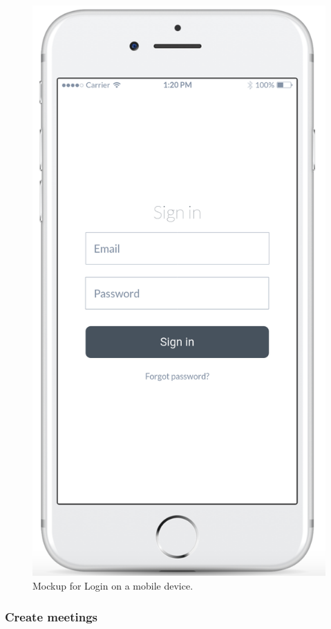 \documentclass{article}
\begin{document}
	\begin{figure}[h!]
		\bigskip
		\centering
		\includegraphics[scale=0.25]{img/mockups/login_m.png}
		\caption{Mockup for Login on a mobile device.}
	\end{figure}
	
	\newpage
	\subsubsection{Create meetings}
	
\end{document}
